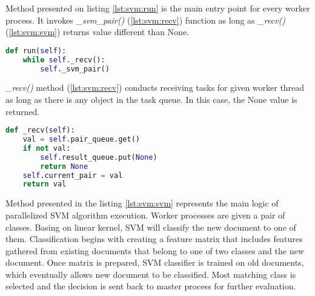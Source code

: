 Method presented on listing \ref{lst:svm:run} is the main entry point for every worker process. It invokes \textit{\_svm\_pair()} (\ref{lst:svm:recv}) function as long as \textit{\_recv()} (\ref{lst:svm:svm}) returns value different than None.

\begin{lstlisting}[language=Python, caption={SVM.run() - SVM class process main method}, label={lst:svm:run}]
def run(self):
    while self._recv():
        self._svm_pair()
\end{lstlisting}

\textit{\_recv()} method (\ref{lst:svm:recv}) conducts receiving tasks for given worker thread as long as there is any object in the task queue. In this case, the None value is returned.

\begin{lstlisting}[language=Python, caption={SVM.\_recv() - SVM class process main method}, label={lst:svm:recv}]
def _recv(self):
    val = self.pair_queue.get()
    if not val:
        self.result_queue.put(None)
        return None
    self.current_pair = val
    return val
\end{lstlisting}

Method presented in the listing \ref{lst:svm:svm} represents the main logic of parallelized SVM algorithm execution.  Worker processes are given a pair of classes. Basing on linear kernel, SVM will classify the new document to one of them. Classification begins with creating a feature matrix that includes features gathered from existing documents that belong to one of two classes and the new document. Once matrix is prepared, SVM classifier is trained on old documents, which eventually allows new document to be classified. Most matching class is selected and the decision is sent back to master process for further evaluation.

